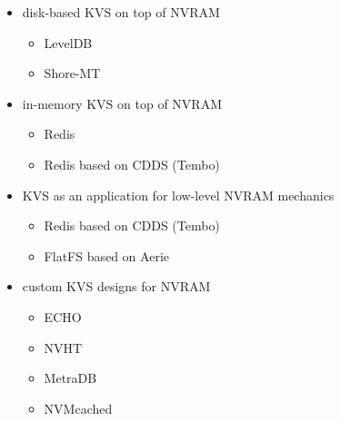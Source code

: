 
\begin{itemize}
    \item disk-based KVS on top of NVRAM
        \begin{itemize}
            \item LevelDB \cite{lersch2017analysis}
            \item Shore-MT \cite{pelley2013storage}
        \end{itemize}
    \item in-memory KVS on top of NVRAM
        \begin{itemize}
            \item Redis \cite{malinowski2017using}
            \item Redis based on CDDS (Tembo) \cite{venkataraman2011consistent}
        \end{itemize}
    \item KVS as an application for low-level NVRAM mechanics
        \begin{itemize}
            \item Redis based on CDDS (Tembo) \cite{venkataraman2011consistent}
            \item FlatFS based on Aerie \cite{volos2014aerie}
        \end{itemize}
    \item custom KVS designs for NVRAM
        \begin{itemize}
            \item ECHO \cite{bailey2013exploring}
            \item NVHT \cite{zhou2016nvht}
            \item MetraDB \cite{marmol2016nonvolatile}
            \item NVMcached \cite{wu2016nvmcached}
        \end{itemize}
\end{itemize}
